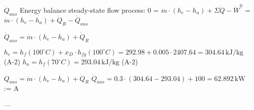 \( \dot{Q}_{aus} \)  
Energy balance steady-state flow process:  
0 = \( \dot{m} \cdot (h_{e} - h_{a}) + \Sigma \dot{Q} - \dot{W}^{0} \)  
= \( \dot{m} \cdot (h_{e} - h_{a}) + \dot{Q}_{R} - \dot{Q}_{aus} \)  

\( \dot{Q}_{aus} = \dot{m} \cdot (h_{e} - h_{a}) + \dot{Q}_{R} \)  

\( h_{e} = h_{f}(100^\circ C) + x_{D} \cdot h_{fg}(100^\circ C) = 292.98 + 0.005 \cdot 2407.64 = 304.64 \, \text{kJ/kg} \) (A-2)  
\( h_{a} = h_{f}(70^\circ C) = 293.04 \, \text{kJ/kg} \) (A-2)  

\( \dot{Q}_{aus} = \dot{m} \cdot (h_{e} - h_{a}) + \dot{Q}_{R} \)  
\( \dot{Q}_{aus} = 0.3 \cdot (304.64 - 293.04) + 100 = 62.892 \, \text{kW} \) := A  

---